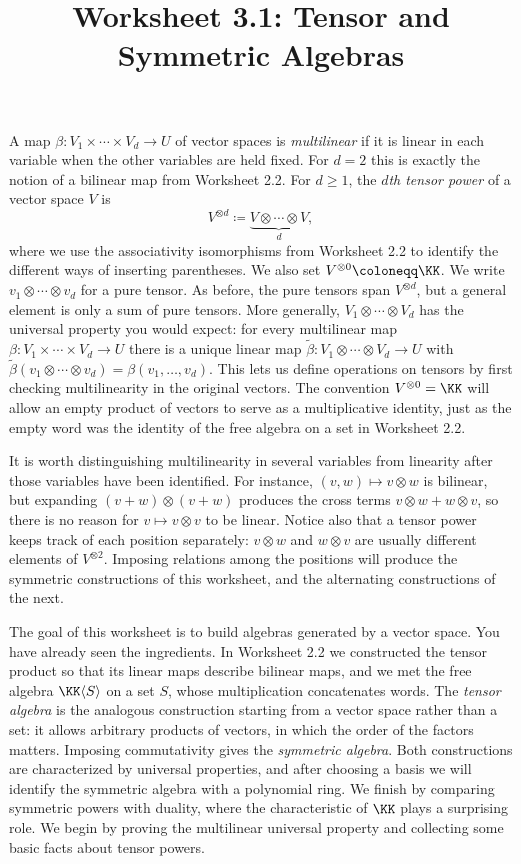 \documentclass[12pt,reqno]{amsart}
\title{Worksheet 3.1: Tensor and Symmetric Algebras}
\begin{document}
\maketitle
\thispagestyle{firstpage}

A map $\beta:V_1\times\cdots\times V_d\to U$ of vector spaces is \emph{multilinear} if it is linear in each variable when the other variables are held fixed. For $d=2$ this is exactly the notion of a bilinear map from Worksheet 2.2. For $d\geq1$, the \emph{$d$th tensor power} of a vector space $V$ is
\[
V^{\otimes d}\coloneqq\underbrace{V\otimes\cdots\otimes V}_{d},
\]
where we use the associativity isomorphisms from Worksheet 2.2 to identify the different ways of inserting parentheses. We also set $V^{\otimes0}\coloneqq\KK$. We write $v_1\otimes\cdots\otimes v_d$ for a pure tensor. As before, the pure tensors span $V^{\otimes d}$, but a general element is only a sum of pure tensors. More generally, $V_1\otimes\cdots\otimes V_d$ has the universal property you would expect: for every multilinear map $\beta:V_1\times\cdots\times V_d\to U$ there is a unique linear map $\widetilde\beta:V_1\otimes\cdots\otimes V_d\to U$ with $\widetilde\beta(v_1\otimes\cdots\otimes v_d)=\beta(v_1,\ldots,v_d)$. This lets us define operations on tensors by first checking multilinearity in the original vectors. The convention $V^{\otimes0}=\KK$ will allow an empty product of vectors to serve as a multiplicative identity, just as the empty word was the identity of the free algebra on a set in Worksheet 2.2.

It is worth distinguishing multilinearity in several variables from linearity after those variables have been identified. For instance, $(v,w)\mapsto v\otimes w$ is bilinear, but expanding $(v+w)\otimes(v+w)$ produces the cross terms $v\otimes w+w\otimes v$, so there is no reason for $v\mapsto v\otimes v$ to be linear. Notice also that a tensor power keeps track of each position separately: $v\otimes w$ and $w\otimes v$ are usually different elements of $V^{\otimes2}$. Imposing relations among the positions will produce the symmetric constructions of this worksheet, and the alternating constructions of the next.

The goal of this worksheet is to build algebras generated by a vector space. You have already seen the ingredients. In Worksheet 2.2 we constructed the tensor product so that its linear maps describe bilinear maps, and we met the free algebra $\KK\langle S\rangle$ on a set $S$, whose multiplication concatenates words. The \emph{tensor algebra} is the analogous construction starting from a vector space rather than a set: it allows arbitrary products of vectors, in which the order of the factors matters. Imposing commutativity gives the \emph{symmetric algebra}. Both constructions are characterized by universal properties, and after choosing a basis we will identify the symmetric algebra with a polynomial ring. We finish by comparing symmetric powers with duality, where the characteristic of $\KK$ plays a surprising role. We begin by proving the multilinear universal property and collecting some basic facts about tensor powers.
\end{document}
